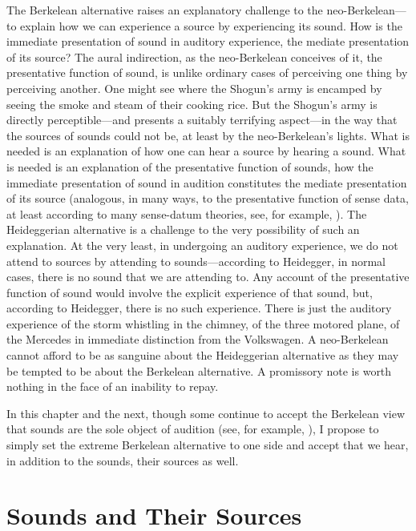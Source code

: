 The Berkelean alternative raises an explanatory challenge to the neo-Berkelean---\-to explain how we can experience a source by experiencing its sound. How is the immediate presentation of sound in auditory experience, the mediate presentation of its source? The aural indirection, as the neo-Berkelean conceives of it, the presentative function of sound, is unlike ordinary cases of perceiving one thing by perceiving another. One might see where the Shogun's army is encamped by seeing the smoke and steam of their cooking rice. But the Shogun's army is directly perceptible---and presents a suitably terrifying aspect---in the way that the sources of sounds could not be, at least by the neo-Berkelean's lights. What is needed is an explanation of how one can hear a source by hearing a sound. What is needed is an explanation of the presentative function of sounds, how the immediate presentation of sound in audition constitutes the mediate presentation of its source (analogous, in many ways, to the presentative function of sense data, at least according to many sense-datum theories, see, for example, \citealt{Price:1932fk}). The Heideggerian alternative is a challenge to the very possibility of such an explanation. At the very least, in undergoing an auditory experience, we do not attend to sources by attending to sounds---according to Heidegger, in normal cases, there is no sound that we are attending to. Any account of the presentative function of sound would involve the explicit experience of that sound, but, according to Heidegger, there is no such experience. There is just the auditory experience of the storm whistling in the chimney, of the three motored plane, of the Mercedes in immediate distinction from the Volkswagen. A neo-Berkelean cannot afford to be as sanguine about the Heideggerian alternative as they may be tempted to be about the Berkelean alternative. A promissory note is worth nothing in the face of an inability to repay.

In this chapter and the next, though some continue to accept the Berkelean view that sounds are the sole object of audition (see, for example, \citealt{Smith:2002sa}), I propose to simply set the extreme Berkelean alternative to one side and accept that we hear, in addition to the sounds, their sources as well. 


\section{Sounds and Their Sources} %
\label{sec:sounds_and_their_sources}

